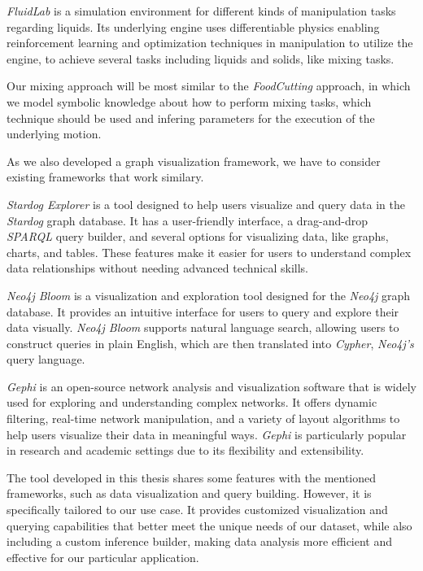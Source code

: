 \textit{FluidLab} \cite{xian2023fluidlab} is a simulation environment for different kinds of manipulation tasks regarding liquids. Its underlying engine uses differentiable physics 
enabling reinforcement learning and optimization techniques in manipulation to utilize the engine, to achieve several tasks 
including liquids and solids, like mixing tasks. 

Our mixing approach will be most similar to the \textit{FoodCutting} approach, in which we model symbolic knowledge about how to perform
mixing tasks, which technique should be used and infering parameters for the execution of the underlying motion.

As we also developed a graph visualization framework, we have to consider existing frameworks that work similary.

\textit{Stardog Explorer} \cite{StardogExplorer} is a tool designed to help users visualize and query data in the \textit{Stardog} graph database. It has a user-friendly interface, a drag-and-drop \textit{SPARQL} query builder, and several options for visualizing data, like graphs, charts, and tables. These features make it easier for users to understand complex data relationships without needing advanced technical skills.

\textit{Neo4j Bloom} \cite{neo4j} is a visualization and exploration tool designed for the \textit{Neo4j} graph database. It provides an intuitive interface for users to query and explore their data visually. \textit{Neo4j Bloom} supports natural language search, allowing users to construct queries in plain English, which are then translated into \textit{Cypher}, \textit{Neo4j's} query language.

\textit{Gephi} \cite{gephi} is an open-source network analysis and visualization software that is widely used for exploring and understanding complex networks. It offers dynamic filtering, real-time network manipulation, and a variety of layout algorithms to help users visualize their data in meaningful ways. \textit{Gephi} is particularly popular in research and academic settings due to its flexibility and extensibility.

The tool developed in this thesis shares some features with the mentioned frameworks, such as data visualization and query building. However, it is specifically tailored to our use case. It provides customized visualization and querying capabilities that better meet the unique needs of our dataset, while also including a custom inference builder, making data analysis more efficient and effective for our particular application.